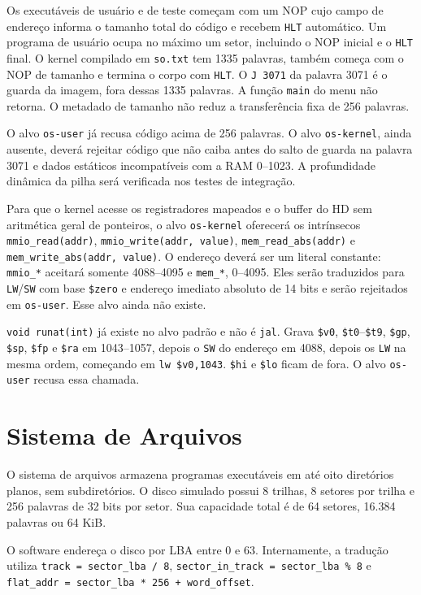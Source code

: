 \documentclass[
    12pt,
    openright,
    a4paper,
    english,
    brazilian
]{abntex2}
\begin{document}
Os executáveis de usuário e de teste começam com um NOP cujo campo de endereço informa o tamanho total do código e recebem \texttt{HLT} automático. Um programa de usuário ocupa no máximo um setor, incluindo o NOP inicial e o \texttt{HLT} final. O kernel compilado em \texttt{so.txt} tem 1335 palavras, também começa com o NOP de tamanho e termina o corpo com \texttt{HLT}. O \texttt{J 3071} da palavra 3071 é o guarda da imagem, fora dessas 1335 palavras. A função \texttt{main} do menu não retorna. O metadado de tamanho não reduz a transferência fixa de 256 palavras.

O alvo \texttt{os-user} já recusa código acima de 256 palavras. O alvo \texttt{os-kernel}, ainda ausente, deverá rejeitar código que não caiba antes do salto de guarda na palavra 3071 e dados estáticos incompatíveis com a RAM 0--1023. A profundidade dinâmica da pilha será verificada nos testes de integração.

Para que o kernel acesse os registradores mapeados e o buffer do HD sem aritmética geral de ponteiros, o alvo \texttt{os-kernel} oferecerá os intrínsecos \texttt{mmio\_read(addr)}, \texttt{mmio\_write(addr, value)}, \texttt{mem\_read\_abs(addr)} e \texttt{mem\_write\_abs(addr, value)}. O endereço deverá ser um literal constante: \texttt{mmio\_*} aceitará somente 4088--4095 e \texttt{mem\_*}, 0--4095. Eles serão traduzidos para \texttt{LW}/\texttt{SW} com base \texttt{\$zero} e endereço imediato absoluto de 14 bits e serão rejeitados em \texttt{os-user}. Esse alvo ainda não existe.

\texttt{void runat(int)} já existe no alvo padrão e não é \texttt{jal}. Grava \texttt{\$v0}, \texttt{\$t0}--\texttt{\$t9}, \texttt{\$gp}, \texttt{\$sp}, \texttt{\$fp} e \texttt{\$ra} em 1043--1057, depois o \texttt{SW} do endereço em 4088, depois os \texttt{LW} na mesma ordem, começando em \texttt{lw \$v0,1043}. \texttt{\$hi} e \texttt{\$lo} ficam de fora. O alvo \texttt{os-user} recusa essa chamada.

\section{Sistema de Arquivos}

O sistema de arquivos armazena programas executáveis em até oito diretórios planos, sem subdiretórios. O disco simulado possui 8 trilhas, 8 setores por trilha e 256 palavras de 32 bits por setor. Sua capacidade total é de 64 setores, 16.384 palavras ou 64 KiB.

O software endereça o disco por LBA entre 0 e 63. Internamente, a tradução utiliza \texttt{track = sector\_lba / 8}, \texttt{sector\_in\_track = sector\_lba \% 8} e \texttt{flat\_addr = sector\_lba * 256 + word\_offset}.
\end{document}
